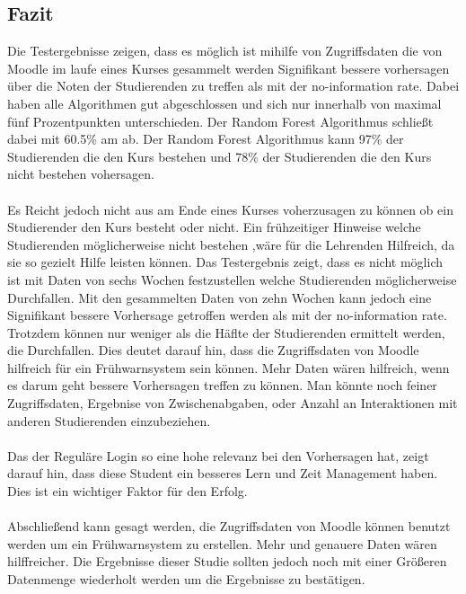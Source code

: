 \subsection{Fazit}
Die Testergebnisse zeigen, dass es möglich ist mihilfe von Zugriffsdaten die von Moodle im laufe eines Kurses gesammelt werden Signifikant bessere vorhersagen über die Noten der Studierenden zu treffen als mit der \glqq no-information rate\grqq{}.
Dabei haben alle Algorithmen gut abgeschlossen und sich nur innerhalb von maximal fünf Prozentpunkten unterschieden. Der Random Forest Algorithmus schließt dabei mit 60.5\% am ab.
Der Random Forest Algorithmus kann 97\% der Studierenden die den Kurs bestehen und 78\% der Studierenden die den Kurs nicht bestehen vohersagen. \cite[S. 14]{Quinn.2020}
\\ \noindent \\ \noindent
Es Reicht jedoch nicht aus am Ende eines Kurses voherzusagen zu können ob ein Studierender den Kurs besteht oder nicht.
Ein frühzeitiger Hinweise welche Studierenden möglicherweise nicht bestehen ,wäre für die Lehrenden Hilfreich, da sie so gezielt Hilfe leisten können.
Das Testergebnis zeigt, dass es nicht möglich ist mit Daten von sechs Wochen festzustellen welche Studierenden möglicherweise Durchfallen. 
Mit den gesammelten Daten von zehn Wochen kann jedoch eine Signifikant bessere Vorhersage getroffen werden als mit der \glqq no-information rate\grqq{}.
Trotzdem können nur weniger als die Häflte der Studierenden ermittelt werden, die Durchfallen. Dies deutet darauf hin, dass die Zugriffsdaten von Moodle hilfreich für ein Frühwarnsystem sein können.
Mehr Daten wären hilfreich, wenn es darum geht bessere Vorhersagen treffen zu können. Man könnte noch feiner Zugriffsdaten, Ergebnise von Zwischenabgaben, oder Anzahl an Interaktionen mit anderen Studierenden einzubeziehen. \cite[S. 14ff]{Quinn.2020}
\\ \noindent \\ \noindent
Das der Reguläre Login so eine hohe relevanz bei den Vorhersagen hat, zeigt darauf hin, dass diese Student ein besseres Lern und Zeit Management haben. Dies ist ein wichtiger Faktor für den Erfolg. \cite[S. 15f]{Quinn.2020}
\\ \noindent \\ \noindent
Abschließend kann gesagt werden, die Zugriffsdaten von Moodle können benutzt werden um ein Frühwarnsystem zu erstellen. Mehr und genauere Daten wären hilffreicher.
Die Ergebnisse dieser Studie sollten jedoch noch mit einer Größeren Datenmenge wiederholt werden um die Ergebnisse zu bestätigen. \cite[S. 16f]{Quinn.2020}
